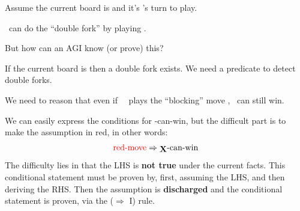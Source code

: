 \begin{tcolorbox}[breakable, parbox=false, fonttitle=\bfseries, title=Tic Tac Toe example]
	
	Assume the current board is
	 and it's \Xb's turn to play.
	
	\Xb \ can do the ``double fork'' by playing
	.
	
	But how can an AGI know (or prove) this?
	
	If the current board is 
	  then a double fork exists.  We need a predicate to detect double forks.
	
	We need to reason that even if \ \bO \ plays the ``blocking'' move
	  , \Xb \ can still win.
	
	We can easily express the conditions for \Xb-can-win, but the difficult part is to make the assumption in {\color{red}red}, in other words:
	\begin{equation}
	\mbox{{\color{red}red-move}} \Rightarrow \mbox{\Xb-can-win}
	\end{equation}
	The difficulty lies in that the LHS is \textbf{not true} under the current facts.  This conditional statement must be proven by, first, assuming the LHS, and then deriving the RHS.  Then the assumption is \textbf{discharged} and the conditional statement is proven, via the ($\Rightarrow$ I) rule.
	
\end{tcolorbox}

